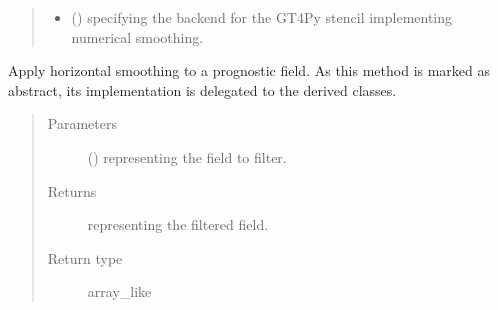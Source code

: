 \documentclass[letterpaper,10pt,english]{sphinxmanual}
\begin{document}
\begin{fulllineitems}
\begin{fulllineitems}
\begin{quote}
\begin{description}
\begin{itemize}
\item {} 
 () \textendash{}  specifying the backend for the GT4Py stencil implementing numerical smoothing.

\end{itemize}

\end{description}\end{quote}

\end{fulllineitems}


\begin{fulllineitems}
\label{\detokenize{api:tasmania.dycore.horizontal_smoothing.HorizontalSmoothing.apply}}
Apply horizontal smoothing to a prognostic field.
As this method is marked as abstract, its implementation is delegated to the derived classes.
\begin{quote}\begin{description}
\item[{Parameters}] \leavevmode
{} () \textendash{}  representing the field to filter.

\item[{Returns}] \leavevmode
{} representing the filtered field.

\item[{Return type}] \leavevmode
array\_like

\end{description}\end{quote}

\end{fulllineitems}



\end{fulllineitems}
\end{document}
